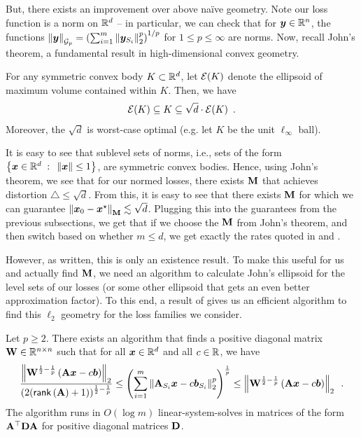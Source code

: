 But, there exists an improvement over above na\"ive geometry. Note our loss function is a norm on $\mathbb{R}^d$ -- in particular, we can check that for $\bm{y}\in\mathbb{R}^n$, the functions $\left\lVert \bm{y} \right\rVert_{\mathcal{G}_{p}}=\left(\sum_{i=1}^m \left\lVert \bm{y}_{S_i} \right\rVert_2^p\right)^{1/p}$ for $1 \le p \le \infty$ are norms. Now, recall John's theorem, a fundamental result in high-dimensional convex geometry.
\begin{theorem}
For any symmetric convex body $K \subset \mathbb{R}^d$, let $\mathcal{E}(K)$ denote the ellipsoid of maximum volume contained within $K$. Then, we have
\begin{align*}
    \mathcal{E}(K) \subseteq K \subseteq \sqrt{d}\cdot \mathcal{E}(K)\enspace.
\end{align*}
Moreover, the $\sqrt{d}$ is worst-case optimal (e.g. let $K$ be the unit $\ell_{\infty}$ ball).
\end{theorem}
It is easy to see that sublevel sets of norms, i.e., sets of the form $\left\{\bm{x}\in\mathbb{R}^d{\;\; : \;\;} \left\lVert \bm{x} \right\rVert\le 1\right\}$, are symmetric convex bodies. Hence, using John's theorem, we see that for our normed losses, there exists $\mathbf{M}$ that achieves distortion $\triangle\le\sqrt{d}$. From this, it is easy to see that there exists $\mathbf{M}$ for which we can guarantee $\left\lVert \bm{x}_0-\bm{x}^{\star} \right\rVert_{\mathbf{M}} \lesssim \sqrt{d}$. Plugging this into the guarantees from the previous subsections, we get that if we choose the $\mathbf{M}$ from John's theorem, and then switch based on whether $m \le d$, we get exactly the rates quoted in  and  .

However, as written, this is only an existence result. To make this useful for us and actually find $\mathbf{M}$, we need an algorithm to calculate John's ellipsoid for the level sets of our losses (or some other ellipsoid that gets an even better approximation factor). To this end, a result of \citet{mo23} gives us an efficient algorithm to find this $\ell_2$ geometry for the loss families we consider.

\begin{theorem}
\label{thm:gp_regression_blw_intro}
Let $p\ge 2$. There exists an algorithm that finds a positive diagonal matrix $\mathbf{W} \in \mathbb{R}^{n \times n}$ such that for all $\bm{x}\in\mathbb{R}^d$ and all $c\in\mathbb{R}$, we have
\begin{align*}
    \frac{\left\lVert \mathbf{W}^{\frac{1}{2}-\frac{1}{p}}\left(\mathbf{A}\bm{x}-c\bm{b}\right) \right\rVert_2}{(2(\mathsf{rank}\left(\mathbf{A}\right)+1))^{\frac{1}{2}-\frac{1}{p}}} \le \left(\sum_{i=1}^m \left\lVert \mathbf{A}_{S_i}\bm{x}-c\bm{b}_{S_i} \right\rVert_2^p\right)^{\frac{1}{p}} \le \left\lVert \mathbf{W}^{\frac{1}{2}-\frac{1}{p}}\left(\mathbf{A}\bm{x}-c\bm{b}\right) \right\rVert_2\enspace.
\end{align*}
The algorithm runs in $O(\log m)$ linear-system-solves in matrices of the form $\mathbf{A}^{\top}\mathbf{D}\mathbf{A}$ for positive diagonal matrices $\mathbf{D}$.%
\end{theorem}


